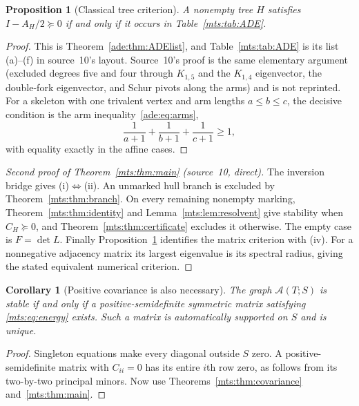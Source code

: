 \documentclass[11pt]{article}
\numberwithin{equation}{section}
\newtheorem{proposition}[theorem]{Proposition}
\newtheorem{corollary}[theorem]{Corollary}
\theoremstyle{definition}
\newcommand{\calA}{\mathcal A}
\begin{document}
\begin{proposition}[Classical tree criterion]\label{mts:prop:ADE}
A nonempty tree $H$ satisfies $I-A_H/2\succeq0$ if and only if it occurs
in Table~\ref{mts:tab:ADE}.
\end{proposition}
\begin{proof}
This is Theorem~\ref{ade:thm:ADElist}, and Table~\ref{mts:tab:ADE} is its
list (a)--(f) in source~10's layout. Source~10's proof is the same
elementary argument (excluded degrees five and four through $K_{1,5}$ and
the $K_{1,4}$ eigenvector, the double-fork eigenvector, and Schur pivots
along the arms) and is not reprinted. For a skeleton with one trivalent
vertex and arm lengths $a\le b\le c$, the decisive condition is the arm
inequality~\eqref{ade:eq:arms},
\begin{equation}
 \frac1{a+1}+\frac1{b+1}+\frac1{c+1}\ge1,
 \label{mts:eq:arms}
\end{equation}
with equality exactly in the affine cases.
\end{proof}

\begin{proof}[Second proof of Theorem~\ref{mts:thm:main} (source~10, direct)]
The inversion bridge gives (i)$\Leftrightarrow$(ii). An unmarked hull
branch is excluded by Theorem~\ref{mts:thm:branch}. On every remaining nonempty
marking, Theorem~\ref{mts:thm:identity} and Lemma~\ref{mts:lem:resolvent} give stability when $C_H\succeq0$,
and Theorem~\ref{mts:thm:certificate} excludes it otherwise. The empty case is
$F=\det L$. Finally Proposition~\ref{mts:prop:ADE} identifies the matrix criterion with
(iv). For a nonnegative adjacency matrix its largest eigenvalue is its
spectral radius, giving the stated equivalent numerical criterion.
\end{proof}

\begin{corollary}[Positive covariance is also necessary]\label{mts:cor:PSDexistence}
The graph $\calA(T;S)$ is stable if and only if a positive-semidefinite
symmetric matrix satisfying \eqref{mts:eq:energy} exists. Such a matrix is
automatically supported on $S$ and is unique.
\end{corollary}
\begin{proof}
Singleton equations make every diagonal outside $S$ zero. A
positive-semidefinite matrix with $C_{ii}=0$ has its entire $i$th row zero,
as follows from its two-by-two principal minors. Now use
Theorems~\ref{mts:thm:covariance} and~\ref{mts:thm:main}.
\end{proof}
\end{document}

